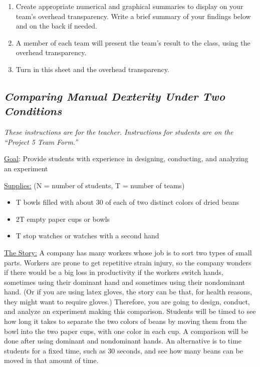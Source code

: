 \begin{enumerate}[leftmargin=1cm, itemsep=.2em]
\item Create appropriate numerical and graphical summaries to display on your team's overhead transparency. Write a brief summary of your findings below and on the back if needed. 
\item A member of each team will present the team's result to the class, using the overhead transparency.
\item Turn in this sheet and the overhead transparency.
\end{enumerate}

\newpage

\subsection{\textbf{\textit{Comparing Manual Dexterity Under Two Conditions}}}

\textit{These instructions are for the teacher. Instructions for students are on the ``Project 5 Team Form.''}\\
\vspace{10pt}

\noindent\underline{Goal}: Provide students with experience in designing, conducting, and analyzing an experiment\\

\vspace{10pt}

\noindent\underline{Supplies:} (N = number of students, T = number of teams)
\begin{itemize}[leftmargin=1cm, itemsep=.2em]
\item T bowls filled with about 30 of each of two distinct colors of dried beans
\item 2T empty paper cups or bowls
\item T stop watches or watches with a second hand
\end{itemize}

\noindent\underline{The Story:} A company has many workers whose job is to sort two types of small parts. Workers are prone to get repetitive strain injury, so the company wonders if there would be a big loss in productivity if the workers switch hands, sometimes using their dominant hand and sometimes using their nondominant hand. (Or if you are using latex gloves, the story can be that, for health reasons, they might want to require gloves.) Therefore, you are going to design, conduct, and analyze an experiment making this comparison. Students will be timed to see how long it takes to separate the two colors of beans by moving them from the bowl into the two paper cups, with one color in each cup. A comparison will be done after using dominant and nondominant hands. An alternative is to time students for a fixed time, such as 30 seconds, and see how many beans can be moved in that amount of time.

